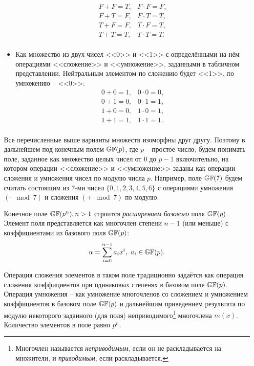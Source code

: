 \begin{itemize}
\[\begin{array}{ll}
	F + F = T,	& 	F \cdot F = F, \\
	F + T = F,	& 	F \cdot T = T, \\
	T + F = F,	& 	T \cdot F = T, \\
	T + T = T,	& 	T \cdot T = T. \\
\end{array}\]
	\item Как множество из двух чисел <<0>> и <<1>> с определёнными на нём операциями <<сложение>> и <<умножение>>, заданными в табличном представлении. Нейтральным элементом по сложению будет <<1>>, по умножению -- <<0>>:
\[\begin{array}{ll}
	0 + 0 = 1,	& 	0 \cdot 0 = 0, \\
	0 + 1 = 0,	& 	0 \cdot 1 = 1, \\
	1 + 0 = 0,	& 	1 \cdot 0 = 1, \\
	1 + 1 = 1,	& 	1 \cdot 1 = 1. \\
\end{array}\]
\end{itemize}

Все перечисленные выше варианты множеств изоморфны друг другу. Поэтому в дальнейшем под конечным полем $\mathbb{GF}(p)$, где $p$ -- простое число, будем понимать поле, заданное как множество целых чисел от $0$ до $p-1$ включительно, на котором операции <<сложение>> и <<умножение>> заданы как операции сложения и умножения чисел по модулю числа $p$. Например, поле $\mathbb{GF}(7)$ будем считать состоящим из 7-ми чисел $\{0, 1, 2, 3, 4, 5, 6\}$ с операциями умножения $(\cdot \mod 7)$ и сложения $(+ \mod 7)$ по модулю.

Конечное поле $\mathbb{GF}(p^n), n > 1$ строится \emph{расширением} \emph{базового} поля $\mathbb{GF}(p)$. Элемент поля представляется как многочлен степени $n-1$ (или меньше) с коэффициентами из базового поля $\mathbb{GF}(p)$:
    \[ \alpha = \sum\limits_{i=0}^{n-1} a_i x^i, ~ a_i \in \mathbb{GF}(p). \]

Операция сложения элементов в таком поле традиционно задаётся как операция сложения коэффициентов при одинаковых степенях в базовом поле $\mathbb{GF}(p)$. Операция умножения -- как умножение многочленов со сложением и умножением коэффициентов в базовом поле $\mathbb{GF}(p)$ и дальнейшим приведением результата по модулю некоторого заданного (для поля) неприводимого\footnote{Многочлен называется \emph{неприводимым}, если он не раскладывается на множители, и \emph{приводимым}, если раскладывается.} многочлена $m(x)$. Количество элементов в поле равно $p^n$.

